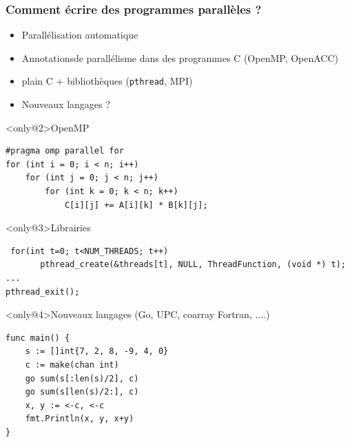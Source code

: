 \documentclass[xcolor={x11names,svgnames}]{beamer}
\newcommand{\red}{\alert}
\begin{document}
\begin{frame}[fragile]
  \frametitle{Comment écrire des programmes parallèles ?}

  \begin{itemize}
  \item<1-> Parallélisation automatique
  \item<2-> \og Annotations\fg de parallélisme dans des programmes C (\red{OpenMP}, OpenACC)
  \item<3-> plain C + bibliothèques (\texttt{pthread}, \red{MPI})
  \item<4-> Nouveaux langages ?
  \end{itemize}

  \medskip

  \begin{overlayarea}{\textwidth}{5cm}
  \begin{block}<only@2>{OpenMP}
\begin{verbatim}
#pragma omp parallel for
for (int i = 0; i < n; i++)
    for (int j = 0; j < n; j++)
        for (int k = 0; k < n; k++)
            C[i][j] += A[i][k] * B[k][j];
\end{verbatim}
  \end{block}


  \begin{block}<only@3>{Librairies}
\begin{verbatim}
 for(int t=0; t<NUM_THREADS; t++)
       pthread_create(&threads[t], NULL, ThreadFunction, (void *) t);
...
pthread_exit();
\end{verbatim}
  \end{block}

  \begin{block}<only@4>{Nouveaux langages (Go, UPC, coarray Fortran, ....)}
\begin{verbatim}
func main() {
    s := []int{7, 2, 8, -9, 4, 0}
    c := make(chan int)
    go sum(s[:len(s)/2], c)
    go sum(s[len(s)/2:], c)
    x, y := <-c, <-c
    fmt.Println(x, y, x+y)
}
\end{verbatim}
  \end{block}
\end{overlayarea}
\end{frame}


\end{document}
